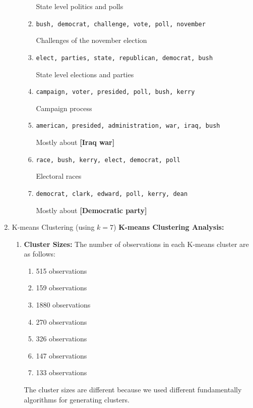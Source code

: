 \documentclass{article}
\begin{document}
\begin{enumerate}[label=\alph*.]
\begin{enumerate}[label=(\roman*)]
\begin{enumerate}[label=\arabic*/]
                                    State level politics and polls
                              \item \texttt{bush, democrat, challenge, vote, poll, november}

                                    Challenges of the november election
                              \item \texttt{elect, parties, state, republican, democrat, bush}

                                    State level elections and parties
                              \item \texttt{campaign, voter, presided, poll, bush, kerry}

                                    Campaign process
                              \item \texttt{american, presided, administration, war, iraq, bush}

                                    Mostly about \textbf{[Iraq war]}
                              \item \texttt{race, bush, kerry, elect, democrat, poll}

                                    Electoral races
                              \item \texttt{democrat, clark, edward, poll, kerry, dean}

                                    Mostly about \textbf{[Democratic party]}
                        \end{enumerate}
            \end{enumerate}

      \item K-means Clustering (using $k=7$)
            \textbf{K-means Clustering Analysis:}
            \begin{enumerate}[label=(\roman*)]
                  \item \textbf{Cluster Sizes:} The number of observations in each K-means cluster are as follows:
                        \begin{enumerate}[label=\arabic*/]
                              \item 515 observations
                              \item 159 observations
                              \item 1880 observations
                              \item 270 observations
                              \item 326 observations
                              \item 147 observations
                              \item 133 observations
                        \end{enumerate}
                        The cluster sizes are different because we used different fundamentally algorithms for generating clusters.


\end{enumerate}
\end{enumerate}
\end{document}
